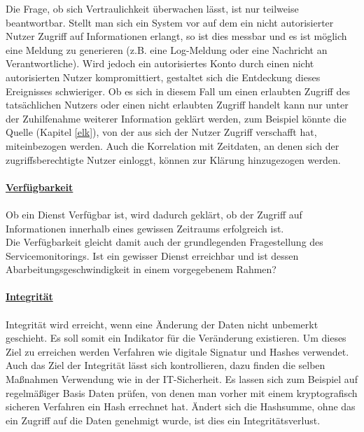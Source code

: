 Die Frage, ob sich Vertraulichkeit überwachen lässt, ist nur teilweise beantwortbar.
Stellt man sich ein System vor auf dem ein nicht autorisierter Nutzer Zugriff auf
Informationen erlangt, so ist dies messbar und es ist möglich eine Meldung 
zu generieren (z.B. eine Log-Meldung oder eine Nachricht an Verantwortliche). Wird 
jedoch ein autorisiertes Konto durch einen nicht autorisierten Nutzer kompromittiert,
gestaltet sich die Entdeckung dieses Ereignisses schwieriger. Ob es sich in diesem Fall 
um einen erlaubten Zugriff des tatsächlichen Nutzers oder einen nicht erlaubten Zugriff
handelt kann nur unter der Zuhilfenahme weiterer Information geklärt werden,
zum Beispiel könnte die Quelle (Kapitel \ref{elk}), von der aus sich der Nutzer Zugriff 
verschafft hat,
miteinbezogen werden. Auch die Korrelation mit Zeitdaten, an denen sich der 
zugriffsberechtigte Nutzer einloggt, können zur Klärung hinzugezogen werden.\\\\

\underline{\textbf{Verfügbarkeit}}\\\\
Ob ein Dienst Verfügbar ist, wird dadurch geklärt, ob der Zugriff auf Informationen
innerhalb eines gewissen Zeitraums erfolgreich ist.\\

Die Verfügbarkeit gleicht damit auch der grundlegenden Fragestellung des 
Servicemonitorings. Ist ein gewisser Dienst erreichbar und ist dessen 
Abarbeitungsgeschwindigkeit in einem vorgegebenem Rahmen?\\\\

\underline{\textbf{Integrität}}\\\\
Integrität wird erreicht, wenn eine Änderung der Daten nicht unbemerkt geschieht. Es soll 
somit ein Indikator für die Veränderung existieren. Um dieses Ziel zu erreichen werden
Verfahren wie digitale Signatur und Hashes verwendet.\\

Auch das Ziel der Integrität lässt sich kontrollieren, dazu finden die selben Maßnahmen 
Verwendung wie in der IT-Sicherheit. Es lassen sich zum Beispiel auf regelmäßiger Basis 
Daten prüfen, von denen man vorher mit einem kryptografisch sicheren Verfahren ein Hash 
errechnet hat. Ändert sich die Hashsumme, ohne das ein Zugriff auf die Daten genehmigt 
wurde, ist dies ein Integritätsverlust.\\

